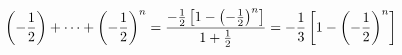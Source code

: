 \documentclass[preview]{standalone}
\begin{document}
\begin{align*}
\special{dvisvgm:raw <g id='unique000'>}\left(-\frac{1}{2}\right)+\cdots+\left(-\frac{1}{2}\right)^n=\frac{-\frac{1}{2}\left[1-\left(-\frac{1}{2}\right)^n\right]}{1+\frac{1}{2}}=-\frac{1}{3}\left[1-\left(-\frac{1}{2}\right)^n\right]\special{dvisvgm:raw </g>}
\end{align*}
\end{document}
